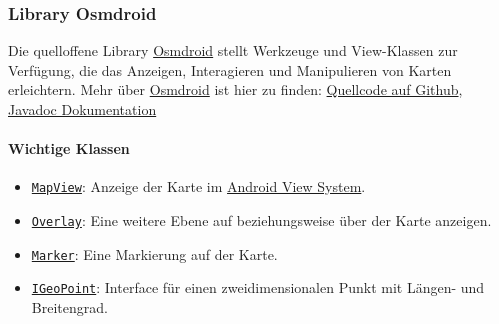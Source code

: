 \subsubsection{Library Osmdroid}
Die quelloffene Library \href{https://osmdroid.github.io/osmdroid/}{Osmdroid} stellt Werkzeuge und View-Klassen zur Verfügung, die das Anzeigen, 
Interagieren und Manipulieren von Karten erleichtern.
Mehr über \href{https://osmdroid.github.io/osmdroid/}{Osmdroid} ist hier zu finden:
\href{https://github.com/osmdroid/osmdroid}{Quellcode auf Github}, 
\href{https://osmdroid.github.io/osmdroid/javadoc.html}{Javadoc Dokumentation}
\paragraph*{Wichtige Klassen}
\begin{itemize}
    \item \texttt{\href{https://osmdroid.github.io/osmdroid/javadocAll/org/osmdroid/views/MapView.html}
    {MapView}}: Anzeige der Karte im \href{https://developer.android.com/reference/android/view/View}{Android View System}.
    \item \texttt{\href{https://osmdroid.github.io/osmdroid/javadocAll/org/osmdroid/views/overlay/Overlay.html}
    {Overlay}}: Eine weitere Ebene auf beziehungsweise über der Karte anzeigen.
    \item \texttt{\href{https://osmdroid.github.io/osmdroid/javadocAll/org/osmdroid/views/overlay/Marker.html}
    {Marker}}: Eine Markierung auf der Karte.
    \item \texttt{\href{https://osmdroid.github.io/osmdroid/javadocAll/org/osmdroid/api/IGeoPoint.html}
    {IGeoPoint}}: Interface für einen zweidimensionalen Punkt mit Längen- und Breitengrad.
\end{itemize}
